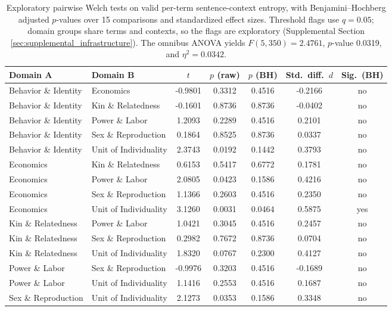 \documentclass[
]{article}
\numberwithin{equation}{section}
\begin{document}
\begin{table}[h]
\centering
\small
\begin{tabular}{|l|l|c|c|c|c|c|}
\hline
\textbf{Domain A} & \textbf{Domain B} & \textbf{$t$} & \textbf{$p$ (raw)} & \textbf{$p$ (BH)} & \textbf{Std.\ diff.\ $d$} & \textbf{Sig.\ (BH)} \\
\hline
Behavior \& Identity & Economics & -0.9801 & 0.3312 & 0.4516 & -0.2166 & no \\
Behavior \& Identity & Kin \& Relatedness & -0.1601 & 0.8736 & 0.8736 & -0.0402 & no \\
Behavior \& Identity & Power \& Labor & 1.2093 & 0.2289 & 0.4516 & 0.2101 & no \\
Behavior \& Identity & Sex \& Reproduction & 0.1864 & 0.8525 & 0.8736 & 0.0337 & no \\
Behavior \& Identity & Unit of Individuality & 2.3743 & 0.0192 & 0.1442 & 0.3793 & no \\
Economics & Kin \& Relatedness & 0.6153 & 0.5417 & 0.6772 & 0.1781 & no \\
Economics & Power \& Labor & 2.0805 & 0.0423 & 0.1586 & 0.4216 & no \\
Economics & Sex \& Reproduction & 1.1366 & 0.2603 & 0.4516 & 0.2350 & no \\
Economics & Unit of Individuality & 3.1260 & 0.0031 & 0.0464 & 0.5875 & yes \\
Kin \& Relatedness & Power \& Labor & 1.0421 & 0.3045 & 0.4516 & 0.2457 & no \\
Kin \& Relatedness & Sex \& Reproduction & 0.2982 & 0.7672 & 0.8736 & 0.0704 & no \\
Kin \& Relatedness & Unit of Individuality & 1.8320 & 0.0767 & 0.2300 & 0.4127 & no \\
Power \& Labor & Sex \& Reproduction & -0.9976 & 0.3203 & 0.4516 & -0.1689 & no \\
Power \& Labor & Unit of Individuality & 1.1416 & 0.2553 & 0.4516 & 0.1687 & no \\
Sex \& Reproduction & Unit of Individuality & 2.1273 & 0.0353 & 0.1586 & 0.3348 & no \\
\hline
\end{tabular}
\caption{Exploratory pairwise Welch tests on valid per-term sentence-context entropy, with Benjamini--Hochberg adjusted $p$-values over 15 comparisons and standardized effect sizes. Threshold flags use $q=0.05$; domain groups share terms and contexts, so the flags are exploratory (Supplemental Section \ref{sec:supplemental_infrastructure}). The omnibus ANOVA yields $F(5,350)=2.4761$, $p$-value 0.0319, and $\eta^2=0.0342$.}
\label{tab:pairwise_domain}
\end{table}
\end{document}
